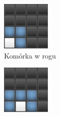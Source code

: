 \documentclass[a4paper]{article}
\begin{document}
\begin{itemize}
\begin{figure}[h!]
        \centering
        \begin{subfigure}[b]{0.2\linewidth}
                \includegraphics[width=\linewidth]{neighbour3}
                \caption{Kom\'orka w rogu}
                \label{fig:n3}
        \end{subfigure}
        \hspace{1.5cm}
        \begin{subfigure}[b]{0.2\linewidth}
                \includegraphics[width=\linewidth]{neighbour5}

\end{subfigure}
\end{figure}
\end{itemize}
\end{document}
